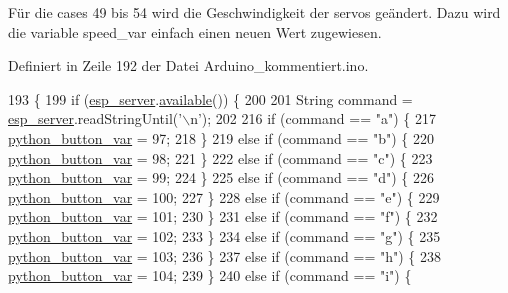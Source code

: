 Für die cases 49 bis 54 wird die Geschwindigkeit der servos geändert. Dazu wird die variable speed\+\_\+var einfach einen neuen Wert zugewiesen.

Definiert in Zeile 192 der Datei Arduino\+\_\+kommentiert.\+ino.


\begin{DoxyCode}
193 \{
199   \textcolor{keywordflow}{if} (\hyperlink{_arduino__kommentiert_8ino_a92309e3a6d185d9188757bac49168fe5}{esp\_server}.\hyperlink{class_esp_server_aad68b4972f6b8426004feeef6e98d02d}{available}()) \{
200 
201     String command = \hyperlink{_arduino__kommentiert_8ino_a92309e3a6d185d9188757bac49168fe5}{esp\_server}.readStringUntil(\textcolor{charliteral}{'\(\backslash\)n'});
202 
216     \textcolor{keywordflow}{if} (command == \textcolor{stringliteral}{"a"}) \{
217       \hyperlink{_arduino__kommentiert_8ino_a409d566aad8f36a68f5c2ec46ce59393}{python\_button\_var} = 97;
218     \}
219     \textcolor{keywordflow}{else} \textcolor{keywordflow}{if} (command == \textcolor{stringliteral}{"b"}) \{
220       \hyperlink{_arduino__kommentiert_8ino_a409d566aad8f36a68f5c2ec46ce59393}{python\_button\_var} = 98;
221     \}
222     \textcolor{keywordflow}{else} \textcolor{keywordflow}{if} (command == \textcolor{stringliteral}{"c"}) \{
223       \hyperlink{_arduino__kommentiert_8ino_a409d566aad8f36a68f5c2ec46ce59393}{python\_button\_var} = 99;
224     \}
225     \textcolor{keywordflow}{else} \textcolor{keywordflow}{if} (command == \textcolor{stringliteral}{"d"}) \{
226       \hyperlink{_arduino__kommentiert_8ino_a409d566aad8f36a68f5c2ec46ce59393}{python\_button\_var} = 100;
227     \}
228     \textcolor{keywordflow}{else} \textcolor{keywordflow}{if} (command == \textcolor{stringliteral}{"e"}) \{
229       \hyperlink{_arduino__kommentiert_8ino_a409d566aad8f36a68f5c2ec46ce59393}{python\_button\_var} = 101;
230     \}
231     \textcolor{keywordflow}{else} \textcolor{keywordflow}{if} (command == \textcolor{stringliteral}{"f"}) \{
232       \hyperlink{_arduino__kommentiert_8ino_a409d566aad8f36a68f5c2ec46ce59393}{python\_button\_var} = 102;
233     \}
234     \textcolor{keywordflow}{else} \textcolor{keywordflow}{if} (command == \textcolor{stringliteral}{"g"}) \{
235       \hyperlink{_arduino__kommentiert_8ino_a409d566aad8f36a68f5c2ec46ce59393}{python\_button\_var} = 103;
236     \}
237     \textcolor{keywordflow}{else} \textcolor{keywordflow}{if} (command == \textcolor{stringliteral}{"h"}) \{
238       \hyperlink{_arduino__kommentiert_8ino_a409d566aad8f36a68f5c2ec46ce59393}{python\_button\_var} = 104;
239     \}
240     \textcolor{keywordflow}{else} \textcolor{keywordflow}{if} (command == \textcolor{stringliteral}{"i"}) \{

\end{DoxyCode}
